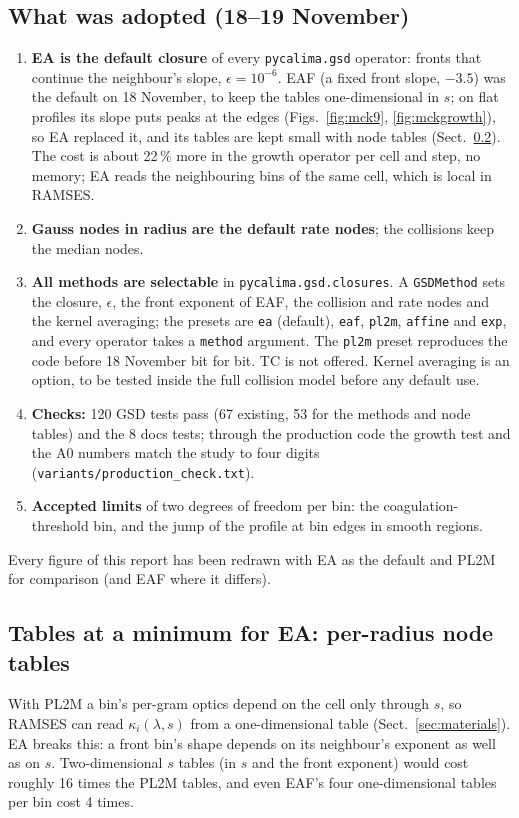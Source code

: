 \documentclass[11pt,a4paper]{article}
\begin{document}
\subsection{What was adopted (18--19 November)}
\begin{enumerate}
\item \textbf{EA is the default closure} of every \texttt{pycalima.gsd} operator: fronts that continue the neighbour's
  slope, $\epsilon = 10^{-6}$. EAF (a fixed front slope, $-3.5$) was the default on 18 November, to keep the tables
  one-dimensional in $s$; on flat profiles its slope puts peaks at the edges (Figs.~\ref{fig:mck9},
  \ref{fig:mckgrowth}), so EA replaced it, and its tables are kept small with node tables (Sect.~\ref{sec:nodetab}).
  The cost is about 22\,\% more in the growth operator per cell and step, no memory; EA reads the neighbouring bins of
  the same cell, which is local in RAMSES.
\item \textbf{Gauss nodes in radius are the default rate nodes}; the collisions keep the median nodes.
\item \textbf{All methods are selectable} in \texttt{pycalima.gsd.closures}. A \texttt{GSDMethod} sets the closure,
  $\epsilon$, the front exponent of EAF, the collision and rate nodes and the kernel averaging; the presets are
  \texttt{ea} (default), \texttt{eaf}, \texttt{pl2m}, \texttt{affine} and \texttt{exp}, and every operator takes a
  \texttt{method} argument. The \texttt{pl2m} preset reproduces the code before 18 November bit for bit. TC is not
  offered. Kernel averaging is an option, to be tested inside the full collision model before any default use.
\item \textbf{Checks:} 120 GSD tests pass (67 existing, 53 for the methods and node tables) and the 8 docs tests;
  through the production code the growth test and the A0 numbers match the study to four digits
  (\texttt{variants/}\allowbreak\texttt{production\_check.txt}).
\item \textbf{Accepted limits} of two degrees of freedom per bin: the coagulation-threshold bin, and the jump of the
  profile at bin edges in smooth regions.
\end{enumerate}
Every figure of this report has been redrawn with EA as the default and PL2M for comparison (and EAF where it
differs).

\subsection{Tables at a minimum for EA: per-radius node tables}\label{sec:nodetab}
With PL2M a bin's per-gram optics depend on the cell only through $s$, so RAMSES can read $\kappa_i(\lambda, s)$ from a
one-dimensional table (Sect.~\ref{sec:materials}). EA breaks this: a front bin's shape depends on its neighbour's
exponent as well as on $s$. Two-dimensional $s$ tables (in $s$ and the front exponent) would cost roughly 16 times the
PL2M tables, and even EAF's four one-dimensional tables per bin cost 4 times.
\end{document}
